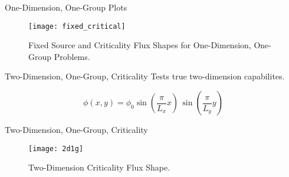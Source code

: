 \begin{frame}{One-Dimension, One-Group Plots}
  \begin{figure}
    \centering
    \texttt{[image: fixed\_critical]}
    \caption{Fixed Source and Criticality Flux Shapes for One-Dimension,
      One-Group Problems.}
    \label{fig:fixed_critical}
  \end{figure}
\end{frame}

\begin{frame}{Two-Dimension, One-Group, Criticality}
  Tests true two-dimension capabilites.
  \begin{table}
    \label{tab:2d1g}
    \begin{center}
    \end{center}
  \end{table}
  \begin{equation}
    \label{eq:analytic_2d1g}
    \phi(x,y) = \phi_0 \sin\left(\frac{\pi}{L_x} x\right) \, 
      \sin\left(\frac{\pi}{L_y} y\right)
  \end{equation}
\end{frame}

\begin{frame}{Two-Dimension, One-Group, Criticality}
  \begin{figure}
    \centering
    \texttt{[image: 2d1g]}
    \caption{Two-Dimension Criticality Flux Shape.}
    \label{fig:2d1g}
  \end{figure}
\end{frame}

